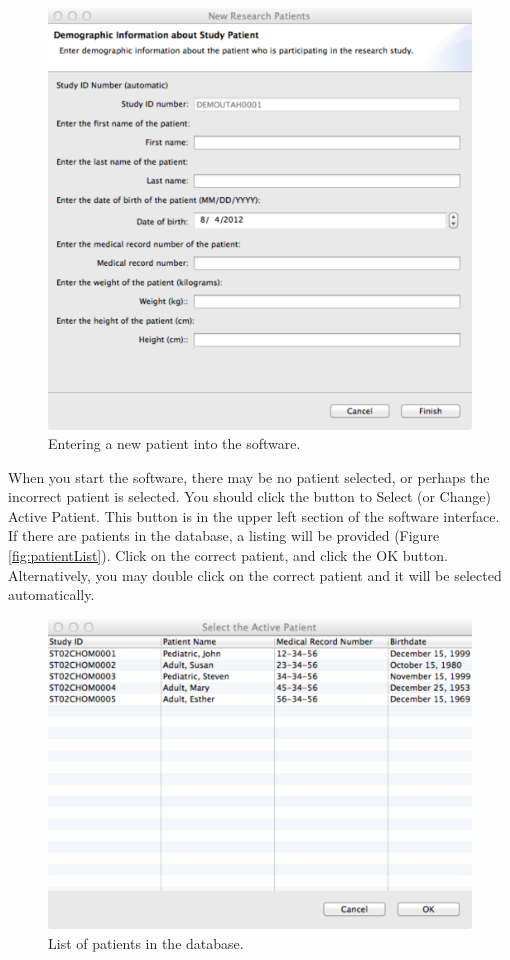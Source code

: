 \begin{figure}[htbp] 
   \centering
   \includegraphics[width=\textwidth]{NewPatientDialog} 
   \caption{Entering a new patient into the software.}
   \label{fig:newPatient}
\end{figure}

When you start the software, there may be no patient selected, or perhaps the incorrect patient is selected.  You 
should click the button to Select (or Change) Active Patient.  This button is in the upper left section of
the software interface.  If there are patients in the database, a listing will be provided (Figure \vref{fig:patientList}).
Click on the correct patient, and click the OK button.  Alternatively, you may double click on the correct patient
and it will be selected automatically.

\begin{figure}[htbp] 
   \centering
   \includegraphics[width=\textwidth]{PatientListDialog} 
   \caption{List of patients in the database.}
   \label{fig:patientList}
\end{figure}


